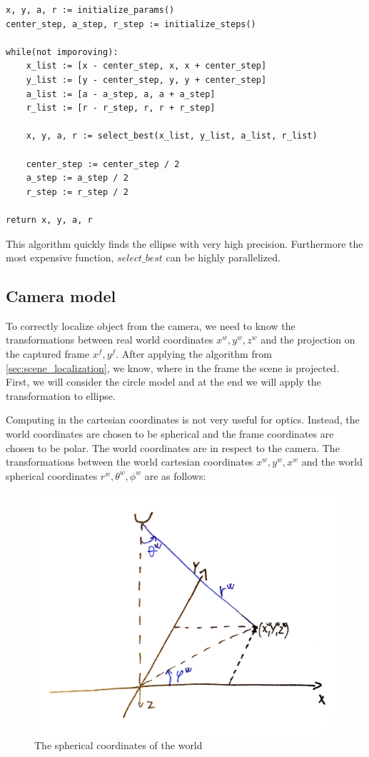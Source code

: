\documentclass[a4paper,12pt,titlepage, twoside]{article}
\numberwithin{figure}{section}
\begin{document}
\begin{verbatim}
x, y, a, r := initialize_params()
center_step, a_step, r_step := initialize_steps()

while(not imporoving):
    x_list := [x - center_step, x, x + center_step]
    y_list := [y - center_step, y, y + center_step]
    a_list := [a - a_step, a, a + a_step]
    r_list := [r - r_step, r, r + r_step]
    
    x, y, a, r := select_best(x_list, y_list, a_list, r_list)
    
    center_step := center_step / 2
    a_step := a_step / 2
    r_step := r_step / 2
    
return x, y, a, r
\end{verbatim}

This algorithm quickly finds the ellipse with very high precision. Furthermore the most expensive function, $select\_best$ can be highly parallelized.

\subsection{Camera model}

To correctly localize object from the camera, we need to know the transformations between real world coordinates $x^w, y^w, z^w$ and the projection on the captured frame $x^f, y^f$. After applying the algorithm from \ref{sec:scene_localization}, we know, where in the frame the scene is projected. First, we will consider the circle model and at the end we will apply the transformation to ellipse. 

Computing in the cartesian coordinates is not very useful for optics. Instead, the world coordinates are chosen to be spherical and the frame coordinates are chosen to be polar. The world coordinates are in respect to the camera. 
The transformations between the world cartesian coordinates $x^w, y^w, x^w$ and the world spherical coordinates $r^w, \theta^w, \phi^w$ are as follows:

\begin{figure}[h]
\centering
\includegraphics[width=1\linewidth]{fig/sphere.jpg}
\caption{The spherical coordinates of the world}
\label{fig:sphere}
\end{figure}
\end{document}
